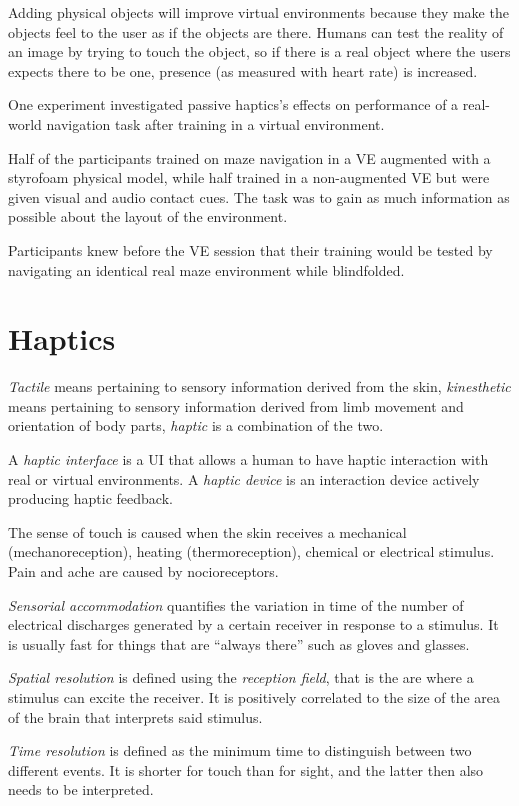 \documentclass[a4paper]{article}
\begin{document}
Adding physical objects will improve virtual environments because they
make the objects feel to the user as if the objects are there.
Humans
can test the reality of an image by trying to touch the object, so if
there is a real object where the users expects there to be one, presence
(as measured with heart rate) is increased.

One experiment investigated passive haptics's effects on performance of
a real-world navigation task after training in a virtual environment.

Half of the participants trained on maze navigation in a VE augmented
with a styrofoam physical model, while half trained in a non-augmented
VE but were given visual and audio contact cues.
The task was to gain as
much information as possible about the layout of the environment.

Participants knew before the VE session that their training would be
tested by navigating an identical real maze environment while
blindfolded.

\section{Haptics}
\emph{Tactile} means pertaining to sensory information derived from the skin, \emph{kinesthetic} means pertaining to sensory information derived from limb movement and orientation of body parts, \emph{haptic} is a combination of the two.

A \emph{haptic interface} is a UI that allows a human to have haptic interaction with real or virtual environments.
A \emph{haptic device} is an interaction device actively producing haptic feedback.

The sense of touch is caused when the skin receives a mechanical (mechanoreception), heating (thermoreception), chemical or electrical stimulus.
Pain and ache are caused by nocioreceptors.

\emph{Sensorial accommodation} quantifies the variation in time of the number of electrical discharges generated by a certain receiver in response to a stimulus.
It is usually fast for things that are ``always there'' such as gloves and glasses.

\emph{Spatial resolution} is defined using the \emph{reception field}, that is the are where a stimulus can excite the receiver.
It is positively correlated to the size of the area of the brain that interprets said stimulus.

\emph{Time resolution} is defined as the minimum time to distinguish between two different events.
It is shorter for touch than for sight, and the latter then also needs to be interpreted.
\end{document}
